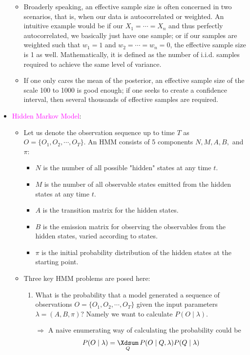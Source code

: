 \documentclass[UTF8]{book}
\DeclareMathOperator*{\Xsum}{\mathchoice{\Xdsum}{\Xtsum}{\Xtsum}{\Xtsum}}
\newcommand{\et}{&}
\newcommand{\concept}[1]{\textcolor{magenta}{#1}}
\begin{document}
\begin{itemize}
\begin{itemize}
	\item Broaderly speaking, an effective sample size is often concerned in two scenarios, that is, when our data is autocorrelated or weighted. An intuitive example would be if our $X_1=\cdots=X_n$ and thus perfectly autocorrelated, we basically just have one sample; or if our samples are weighted such that $w_1=1$ and $w_2=\cdots=w_n=0$, the effective sample size is 1 as well. Mathematically, it is defined as the number of i.i.d. samples required to achieve the same level of variance.
	\item If one only cares the mean of the posterior, an effective sample size of the scale 100 to 1000 is good enough; if one seeks to create a confidence interval, then several thousands of effective samples are required.
\end{itemize}
\item \concept{Hidden Markov Model}:
\begin{itemize}
	\item Let us denote the observation sequence up to time $T$ as $O=\{O_1,O_2,\cdots,O_T\}$. An HMM consists of 5 components $N,M,A,B,$ and $\pi$:
	\begin{itemize}
		\item $N$ is the number of all possible "hidden" states at any time $t$.
		\item $M$ is the number of all observable states emitted from the hidden states at any time $t$.
		\item $A$ is the transition matrix for the hidden states.
		\item $B$ is the emission matrix for observing the observables from the hidden states, varied according to states.
		\item $\pi$ is the initial probability distribution of the hidden states at the starting point.
	\end{itemize}
	\item Three key HMM problems are posed here:
	\begin{enumerate}
		\item What is the probability that a model generated a sequence of observations $O = \{O_1,O_2,\cdots,O_T\}$ given the input parameters $\lambda = (A,B,\pi)$? Namely we want to calculate $P(O\mid\lambda)$.
		\item[$\Rightarrow$] A naive enumerating way of calculating the probability could be
		\begin{align*}
			P(O\mid\lambda) \et = \Xsum_{Q}P(O\mid Q,\lambda)P(Q\mid\lambda)\\

\end{align*}
\end{enumerate}
\end{itemize}
\end{itemize}
\end{document}
